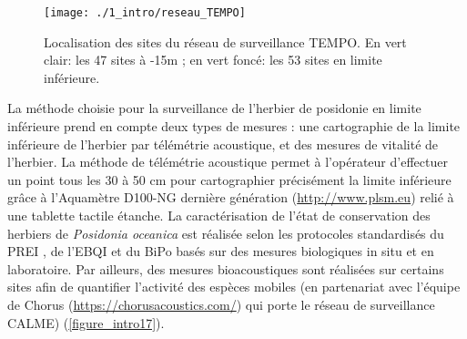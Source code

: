 \begin{figure}[H]
	\begin{center}
	\texttt{[image: ./1\_intro/reseau\_TEMPO]}
		\caption[Localisation des sites du réseau de surveillance TEMPO]{Localisation des sites du réseau de surveillance TEMPO. En vert clair: les 47 sites à -15m ; en vert foncé: les 53 sites en limite inférieure.}
	\label{figure_intro16}
\end{center}
\end{figure}

La méthode choisie pour la surveillance de l’herbier de posidonie en limite inférieure prend en compte deux types de mesures : une cartographie de la limite inférieure de l’herbier par télémétrie acoustique, et des mesures de vitalité de l’herbier. La méthode de télémétrie acoustique permet à l’opérateur d’effectuer un point tous les 30 à 50 cm pour cartographier précisément la limite inférieure grâce à l’Aquamètre D100-NG dernière génération (\href{http://www.plsm.eu}{http://www.plsm.eu}) relié à une tablette tactile étanche. La caractérisation de l’état de conservation des herbiers de \textit{Posidonia oceanica} est réalisée selon les protocoles standardisés du PREI \citep{gobert_assessment_2009}, de l’EBQI \citep{personnic_ecosystem-based_2014} et du BiPo \citep{lopez_y_royo_biotic_2010} basés sur des mesures biologiques in situ et en laboratoire. Par ailleurs, des mesures bioacoustiques sont réalisées sur certains sites afin de quantifier l’activité des espèces mobiles (en partenariat avec l’équipe de Chorus (\href{https://chorusacoustics.com/}{https://chorusacoustics.com/}) qui porte le réseau de surveillance CALME) (\autoref{figure_intro17}).

\medskip 

\setlength{\fboxsep}{5pt}
\setlength{\fboxrule}{0.6pt}
\noindent{}

